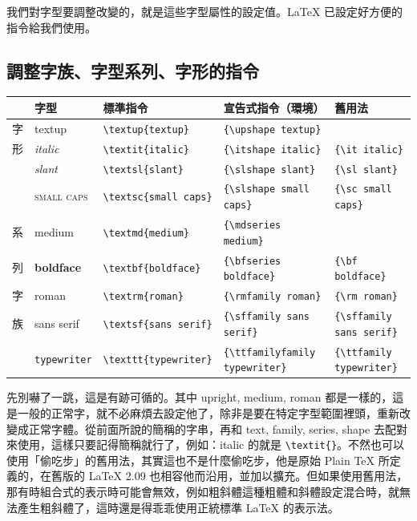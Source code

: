 我們對字型要調整改變的，就是這些字型屬性的設定值。\LaTeX{} 已設定好方便的指令給我們使用。

\subsection{調整字族、字型系列、字形的指令}
\label{subsec:font-command}

\linespread{1.0}
\small
\begin{tabular}[\textwidth]{lllll}
      & 字型                & 標準指令                & 宣告式指令（環境）      & 舊用法                  \\
   \hline
   字 & \textup{textup}     & \verb|\textup{textup}| & \verb|{\upshape textup}| &                         \\
   形 & \textit{italic}     & \verb|\textit{italic}| & \verb|{\itshape italic}| & \verb|{\it italic}| \\
      & \textsl{slant}      & \verb|\textsl{slant}| & \verb|{\slshape slant}| & \verb|{\sl slant}| \\
      & \textsc{small caps} & \verb|\textsc{small caps}| & \verb|{\slshape small caps}| & \verb|{\sc small caps}| \\
   \hline
   系 & \textmd{medium}     & \verb|\textmd{medium}| & \verb|{\mdseries medium}| &                         \\
   列 & \textbf{boldface}   & \verb|\textbf{boldface}| & \verb|{\bfseries boldface}| & \verb|{\bf boldface}| \\
   \hline
   字 & \textrm{roman}      & \verb|\textrm{roman}| & \verb|{\rmfamily roman}| & \verb|{\rm roman}| \\
   族 & \textsf{sans serif} & \verb|\textsf{sans serif}| & \verb|{\sffamily sans serif}| & \verb|{\sffamily sans serif}| \\
      & \texttt{typewriter} & \verb|\texttt{typewriter}| & \verb|{\ttfamilyfamily typewriter}| & \verb|{\ttfamily typewriter}| \\
\end{tabular}
\linespread{1.36}
\normalsize

先別嚇了一跳，這是有跡可循的。其中 upright, medium, roman 都是一樣的，這是一般的正常字，就不必麻煩去設定他了，除非是要在特定字型範圍裡頭，重新改變成正常字體。從前面所說的簡稱的字串，再和 text, family, series, shape 去配對來使用，這樣只要記得簡稱就行了，例如：italic 的就是 \verb|\textit{}|。不然也可以使用「偷吃步」的舊用法，其實這也不是什麼偷吃步，他是原始 Plain \TeX{} 所定義的，在舊版的 \LaTeX{} 2.09 也相容他而沿用，並加以擴充。但如果使用舊用法，那有時組合式的表示時可能會無效，例如粗斜體這種粗體和斜體設定混合時，就無法產生粗斜體了，這時還是得乖乖使用正統標準 \LaTeX{} 的表示法。

